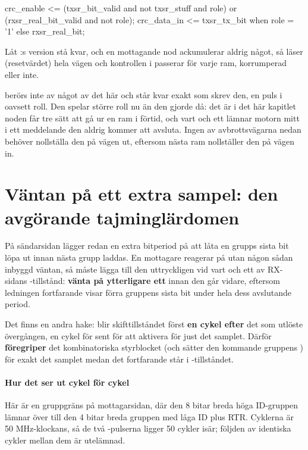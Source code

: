 \begin{vhdlcode}
crc_enable  <= (txsr_bit_valid and not txsr_stuff and role) or
               (rxsr_real_bit_valid and not role);
crc_data_in <= txsr_tx_bit when role = '1' else rxsr_real_bit;
\end{vhdlcode}

Låt :s version stå kvar, och en mottagande nod ackumulerar aldrig något, så
 läser  (resetvärdet) hela vägen och kontrollen i 
passerar för varje ram, korrumperad eller inte.

 berörs inte av något av det här och står kvar exakt som  skrev den,
en puls i  oavsett roll. Den spelar större roll nu än den gjorde då: det är i det
här kapitlet noden får tre sätt att gå ur en ram i förtid, och vart och ett lämnar motorn mitt i ett
meddelande den aldrig kommer att avsluta. Ingen av avbrottsvägarna nedan behöver nollställa den på
vägen ut, eftersom nästa ram nollställer den på vägen in.

\section{Väntan på ett extra sampel: den avgörande tajminglärdomen}
\label{c17:sec:preempt}

På sändarsidan lägger  redan en extra bitperiod på att låta en grupps sista
bit löpa ut innan nästa grupp laddas. En mottagare reagerar på  utan någon
sådan inbyggd väntan, så  måste lägga till den uttryckligen vid vart och ett av
RX-sidans -tillstånd: \textbf{vänta på ytterligare ett } innan den
går vidare, eftersom ledningen fortfarande visar förra gruppens sista bit under hela dess avslutande
period.

Det finns en andra hake:  blir skifttillståndet först \textbf{en cykel efter} det
 som utlöste övergången, en cykel för sent för att aktivera  för
just det samplet. Därför \textbf{föregriper} det kombinatoriska styrblocket  (och
sätter den kommande gruppens ) för exakt det samplet medan det fortfarande står i
-tillståndet.

\paragraph{Hur det ser ut cykel för cykel}
Här är en gruppgräns på mottagarsidan, där den 8 bitar breda höga ID-gruppen lämnar över till den 4
bitar breda gruppen med låga ID plus RTR. Cyklerna är 50 MHz-klockans, så de två
-pulserna ligger 50 cykler isär; följden av identiska cykler mellan dem är utelämnad.

